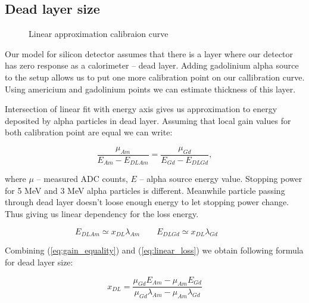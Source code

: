 \documentclass[a4paper]{article}
\begin{document}
\subsection{Dead layer size}

\begin{figure}
\vspace{-30pt}
\begin{center}
\end{center}
\caption{Linear approximation calibraion curve}
\label{fig:calib_curve}
\end{figure}

Our model for silicon detector assumes that there is a layer where our detector has
zero response as a calorimeter -- dead layer. Adding gadolinium alpha source to the
setup allows us to put one more calibration point on our callibration curve. Using
americium and gadolinium points we can estimate thickness of this layer.

Intersection of linear fit with energy axis gives us approximation to energy
deposited by alpha particles in dead layer.
Assuming that local gain values for both calibration point are equal we can write:

\begin{equation}
\frac{\mu_{Am}}{E_{Am} - E_{DLAm}} = \frac{\mu_{Gd}}{E_{Gd} - E_{DLGd}},
\label{eq:gain_equality}
\end{equation}

\noindent where $\mu$ -- measured ADC counts, $E$ -- alpha source energy value.
Stopping power for 5 MeV and 3 MeV alpha particles is different. Meanwhile
particle passing through dead layer doesn't loose enough energy to let
stopping power change. Thus giving us linear dependency for the loss energy.

\begin{equation}
E_{DLAm} \simeq x_{DL} \lambda_{Am}\qquad
E_{DLGd} \simeq x_{DL} \lambda_{Gd}\qquad
\label{eq:linear_loss}
\end{equation}

Combining (\ref{eq:gain_equality}) and (\ref{eq:linear_loss}) we obtain following formula
for dead layer size:

\begin{equation}
x_{DL} = \frac{\mu_{Gd} E_{Am} - \mu_{Am} E_{Gd}}{\mu_{Gd}\lambda_{Am} - \mu_{Am}\lambda_{Gd}}
\label{eq:x_dl}
\end{equation}
\end{document}
